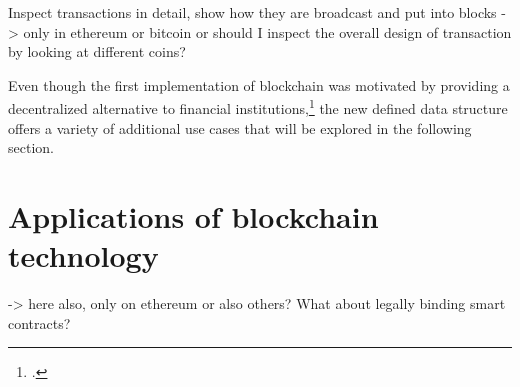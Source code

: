 Inspect transactions in detail, show how they are broadcast and put into blocks
-> only in ethereum or bitcoin or should I inspect the overall design of transaction by looking at different coins?

Even though the first implementation of blockchain was motivated by providing a decentralized alternative to financial institutions,\footcite[Cf.][p.2]{Nakamoto.2008} the new defined data structure offers a variety of additional use cases that will be explored in the following section.

\section{Applications of blockchain technology} \label{sec:SmartContracts}

-> here also, only on ethereum or also others? What about legally binding smart contracts?
